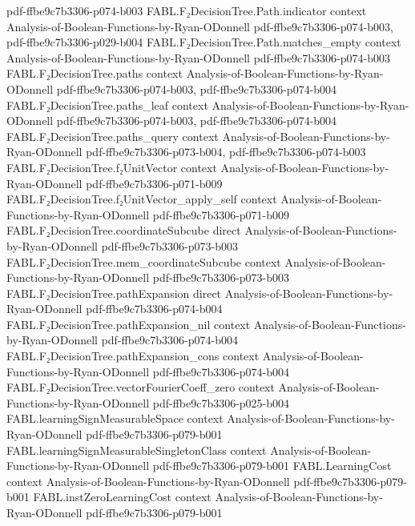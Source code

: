 \begin{theorem}
  {pdf-ffbe9c7b3306-p074-b003}
\proofstep
  {FABL.F₂DecisionTree.Path.indicator}
  {context}
  {Analysis-of-Boolean-Functions-by-Ryan-ODonnell}
  {pdf-ffbe9c7b3306-p074-b003,
    pdf-ffbe9c7b3306-p029-b004}
\proofstep
  {FABL.F₂DecisionTree.Path.matches_empty}
  {context}
  {Analysis-of-Boolean-Functions-by-Ryan-ODonnell}
  {pdf-ffbe9c7b3306-p074-b003}
\proofstep
  {FABL.F₂DecisionTree.paths}
  {context}
  {Analysis-of-Boolean-Functions-by-Ryan-ODonnell}
  {pdf-ffbe9c7b3306-p074-b003,
    pdf-ffbe9c7b3306-p074-b004}
\proofstep
  {FABL.F₂DecisionTree.paths_leaf}
  {context}
  {Analysis-of-Boolean-Functions-by-Ryan-ODonnell}
  {pdf-ffbe9c7b3306-p074-b003,
    pdf-ffbe9c7b3306-p074-b004}
\proofstep
  {FABL.F₂DecisionTree.paths_query}
  {context}
  {Analysis-of-Boolean-Functions-by-Ryan-ODonnell}
  {pdf-ffbe9c7b3306-p073-b004,
    pdf-ffbe9c7b3306-p074-b003}
\proofstep
  {FABL.F₂DecisionTree.f₂UnitVector}
  {context}
  {Analysis-of-Boolean-Functions-by-Ryan-ODonnell}
  {pdf-ffbe9c7b3306-p071-b009}
\proofstep
  {FABL.F₂DecisionTree.f₂UnitVector_apply_self}
  {context}
  {Analysis-of-Boolean-Functions-by-Ryan-ODonnell}
  {pdf-ffbe9c7b3306-p071-b009}
\proofstep
  {FABL.F₂DecisionTree.coordinateSubcube}
  {direct}
  {Analysis-of-Boolean-Functions-by-Ryan-ODonnell}
  {pdf-ffbe9c7b3306-p073-b003}
\proofstep
  {FABL.F₂DecisionTree.mem_coordinateSubcube}
  {context}
  {Analysis-of-Boolean-Functions-by-Ryan-ODonnell}
  {pdf-ffbe9c7b3306-p073-b003}
\proofstep
  {FABL.F₂DecisionTree.pathExpansion}
  {direct}
  {Analysis-of-Boolean-Functions-by-Ryan-ODonnell}
  {pdf-ffbe9c7b3306-p074-b004}
\proofstep
  {FABL.F₂DecisionTree.pathExpansion_nil}
  {context}
  {Analysis-of-Boolean-Functions-by-Ryan-ODonnell}
  {pdf-ffbe9c7b3306-p074-b004}
\proofstep
  {FABL.F₂DecisionTree.pathExpansion_cons}
  {context}
  {Analysis-of-Boolean-Functions-by-Ryan-ODonnell}
  {pdf-ffbe9c7b3306-p074-b004}
\proofstep
  {FABL.F₂DecisionTree.vectorFourierCoeff_zero}
  {context}
  {Analysis-of-Boolean-Functions-by-Ryan-ODonnell}
  {pdf-ffbe9c7b3306-p025-b004}
\proofstep
  {FABL.learningSignMeasurableSpace}
  {context}
  {Analysis-of-Boolean-Functions-by-Ryan-ODonnell}
  {pdf-ffbe9c7b3306-p079-b001}
\proofstep
  {FABL.learningSignMeasurableSingletonClass}
  {context}
  {Analysis-of-Boolean-Functions-by-Ryan-ODonnell}
  {pdf-ffbe9c7b3306-p079-b001}
\proofstep
  {FABL.LearningCost}
  {context}
  {Analysis-of-Boolean-Functions-by-Ryan-ODonnell}
  {pdf-ffbe9c7b3306-p079-b001}
\proofstep
  {FABL.instZeroLearningCost}
  {context}
  {Analysis-of-Boolean-Functions-by-Ryan-ODonnell}
  {pdf-ffbe9c7b3306-p079-b001}

\end{theorem}
